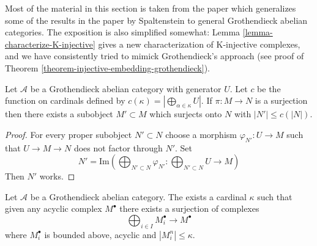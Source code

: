 \noindent
Most of the material in this section is taken from the paper
\cite{serpe} which generalizes some of the results in the paper
\cite{Spaltenstein}
by Spaltenstein to general Grothendieck abelian categories.
The exposition is also simplified somewhat:
Lemma \ref{lemma-characterize-K-injective}
gives a new characterization of K-injective complexes,
and we have consistently tried to mimick Grothendieck's approach
(see proof of
Theorem \ref{theorem-injective-embedding-grothendieck}).

\begin{lemma}
\label{lemma-surjection-bounded-size}
Let $\mathcal{A}$ be a Grothendieck abelian category with generator $U$.
Let $c$ be the function on cardinals defined by
$c(\kappa) = |\bigoplus_{\alpha \in \kappa} U|$. If $\pi : M \to N$ is a
surjection then there exists a subobject $M' \subset M$ which surjects
onto $N$ with $|N'| \leq c(|N|)$.
\end{lemma}

\begin{proof}
For every proper subobject $N' \subset N$ choose a morphism
$\varphi_{N'} : U \to M$ such that $U \to M \to N$ does not factor
through $N'$. Set
$$
N' = \text{Im}\left(
\bigoplus\nolimits_{N' \subset N} \varphi_{N'} :
\bigoplus\nolimits_{N' \subset N} U \longrightarrow M\right)
$$
Then $N'$ works.
\end{proof}

\begin{lemma}
\label{lemma-acyclic-quotient-complexes-bounded-size}
Let $\mathcal{A}$ be a Grothendieck abelian category.
The exists a cardinal $\kappa$ such that given any acyclic complex $M^\bullet$
there exists a surjection of complexes
$$
\bigoplus\nolimits_{i \in I} M_i^\bullet \longrightarrow M^\bullet
$$
where $M_i^\bullet$ is bounded above, acyclic and $|M_i^n| \leq \kappa$.
\end{lemma}

